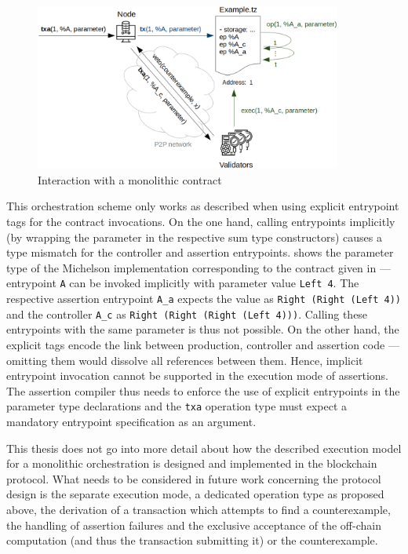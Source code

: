 \begin{figure}
\centering
  \includegraphics[width=0.9\textwidth]{figures/5-offline_tezos/interaction_monolithic_2}
	\caption{Interaction with a monolithic contract}
	\label{fig:interaction_monolithic}
\end{figure}

This orchestration scheme only works as described when using explicit entrypoint tags for the contract invocations. On the one hand, calling entrypoints implicitly (by wrapping the parameter in the respective sum type constructors) causes a type mismatch for the controller and assertion entrypoints.  shows the parameter type of the Michelson implementation corresponding to the contract given in  --- entrypoint \texttt{A} can be invoked implicitly with parameter value \texttt{Left 4}. The respective assertion entrypoint \texttt{A\_a} expects the value as \texttt{Right (Right (Left 4))} and the controller \texttt{A\_c} as \texttt{Right (Right (Right (Left 4)))}. Calling these entrypoints with the same parameter is thus not possible. On the other hand, the explicit tags encode the link between production, controller and assertion code --- omitting them would dissolve all references between them. Hence, implicit entrypoint invocation cannot be supported in the execution mode of assertions. The assertion compiler thus needs to enforce the use of explicit entrypoints in the parameter type declarations and the \texttt{txa} operation type must expect a mandatory entrypoint specification as an argument.


This thesis does not go into more detail about how the described execution model for a monolithic orchestration is designed and implemented in the blockchain protocol. What needs to be considered in future work concerning the protocol design is the separate execution mode, a dedicated operation type as proposed above, the derivation of a transaction which attempts to find a counterexample, the handling of assertion failures and the exclusive acceptance of the off-chain computation (and thus the transaction submitting it) or the counterexample.


